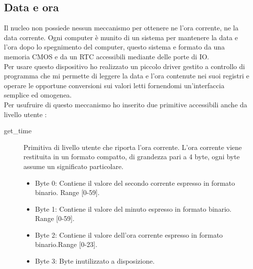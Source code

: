  \subsection{Data e ora}
 Il nucleo non possiede nessun meccanismo per ottenere ne l'ora corrente, ne la data corrente. Ogni computer è munito di un sistema per mantenere la data e l'ora dopo lo spegnimento del computer, questo sistema e formato da una memoria CMOS e da un RTC accessibili mediante delle porte di IO.\\
 Per usare questo dispositivo ho realizzato un piccolo driver gestito a controllo di programma che mi permette di leggere la data e l'ora contenute nei suoi registri e operare le opportune conversioni sui valori letti fornendomi un'interfaccia semplice ed omogenea.\\
 Per usufruire di questo meccanismo ho inserito due primitive accessibili anche da livello utente : 
 \begin{description}
  \item[get\_time]
    Primitiva di livello utente che riporta l'ora corrente. L'ora corrente viene restituita in un formato compatto, di grandezza pari a 4 byte, ogni byte assume un significato particolare. 
    \begin{itemize}
     \item Byte 0: Contiene il valore del secondo corrente espresso in formato binario. Range [0-59]. 
    \end{itemize}
    \begin{itemize}
     \item Byte 1: Contiene il valore del minuto espresso in formato binario. Range [0-59].  
    \end{itemize}
    \begin{itemize}
     \item Byte 2: Contiene il valore dell'ora corrente espresso in formato binario.Range [0-23].
    \end{itemize}
    \begin{itemize}
     \item Byte 3: Byte inutilizzato a disposizione.
    \end{itemize}
  \end{description}
  
